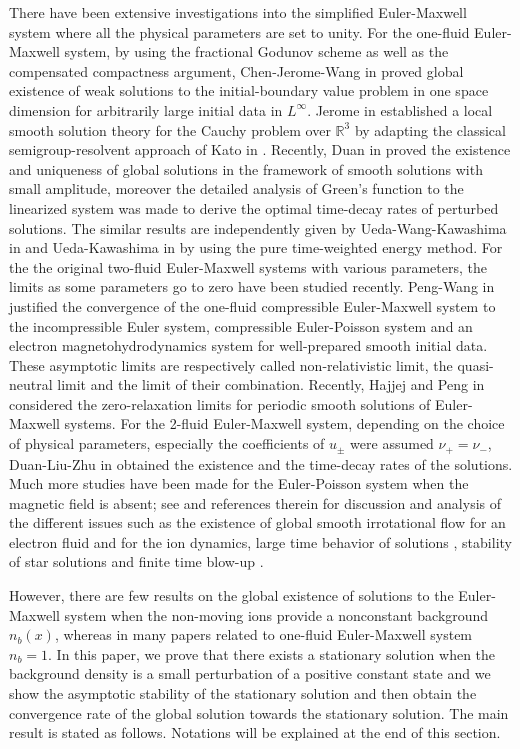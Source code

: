 \documentclass[11pt]{amsart}
\numberwithin{equation}{section}
\begin{document}
There have been extensive investigations into the simplified
Euler-Maxwell system where all the physical parameters are set to
unity. For the one-fluid Euler-Maxwell system, by using the
fractional Godunov scheme as well as the compensated compactness
argument, Chen-Jerome-Wang in \cite{Chen} proved global existence of
weak solutions to the initial-boundary value problem in one space
dimension for arbitrarily large initial data in $L^{\infty}$. Jerome
in \cite{Jerome} established a local smooth solution theory for the
Cauchy problem over $\mathbb{R}^3$ by adapting the classical
semigroup-resolvent approach of Kato in \cite{Kato}. Recently, Duan
in \cite{Duan} proved the existence and uniqueness of global
solutions in the framework of smooth solutions with small amplitude,
moreover the detailed analysis of Green's function to the linearized
system was made to derive the optimal time-decay rates of perturbed
solutions. The similar results are independently given by
Ueda-Wang-Kawashima in \cite{USK} and Ueda-Kawashima in \cite{UK} by
using the pure time-weighted energy method. For the the original
two-fluid Euler-Maxwell systems
 with various parameters, the limits as some parameters go to zero
 have been studied recently.
 Peng-Wang in \cite{Peng ,PW1,PW2} justified the convergence of the one-fluid compressible
Euler-Maxwell system to the incompressible Euler system,
compressible Euler-Poisson system and an electron
magnetohydrodynamics system for well-prepared smooth initial data.
These asymptotic  limits are respectively called non-relativistic
limit, the quasi-neutral limit and the limit of their combination.
Recently, Hajjej and Peng in \cite{HP} considered the
zero-relaxation limits for periodic smooth solutions of
Euler-Maxwell systems. For the 2-fluid Euler-Maxwell system,
depending on the choice of physical parameters, especially the
coefficients of $u_{\pm}$ were assumed $\nu_{+}=\nu_{-}$,
Duan-Liu-Zhu in \cite{DLZ} obtained the existence and the time-decay
rates of the solutions.  Much more studies have been made for the
Euler-Poisson system when the magnetic field is absent; see
\cite{Guo,GuoPausader,Luo,Deng,Smoller,Chae} and references therein
for discussion and analysis of the different issues such as the
existence of global smooth irrotational flow \cite{Guo} for an
electron fluid and \cite{GuoPausader} for the ion dynamics, large
time behavior of solutions \cite{Luo}, stability of star solutions
\cite{Deng,Smoller} and finite time blow-up \cite{Chae}.

However, there are few results on the global existence of solutions
to the Euler-Maxwell system when the non-moving ions  provide a
nonconstant background $n_{b}(x)$, whereas in many papers related to
one-fluid Euler-Maxwell  system $n_{b}=1$. In this paper, we prove
that there exists a stationary  solution when the background density
is a small perturbation of a positive constant state and we show the
asymptotic stability of  the stationary solution and then obtain the
convergence rate of the global solution towards the stationary
solution. The main result is stated as follows. Notations will be
explained at the end of this section.
\end{document}
